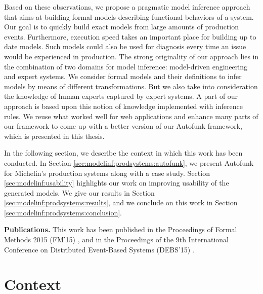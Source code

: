 Based on these observations, we propose a pragmatic model
inference approach that aims at building formal models describing
functional behaviors of a system. Our goal is to quickly build
exact models from large amounts of production events.
Furthermore, execution speed takes an important place for
building up to date models. Such models could also be used for
diagnosis every time an issue would be experienced in production.
The strong originality of our approach lies in the combination of
two domains for model inference: model-driven engineering and
expert systems. We consider formal models and their definitions
to infer models by means of different transformations. But we
also take into consideration the knowledge of human experts
captured by expert systems. A part of our approach is based upon
this notion of knowledge implemented with inference rules. We
reuse what worked well for web applications and enhance many
parts of our framework to come up with a better version of our
Autofunk framework, which is presented in this thesis.

In the following section, we describe the context in which this
work has been conducted. In Section
\ref{sec:modelinf:prodsystems:autofunk}, we present Autofunk for
Michelin's production systems along with a case study. Section
\ref{sec:modelinf:usability} highlights our work on improving
usability of the generated models.  We give our results in
Section \ref{sec:modelinf:prodsystems:results}, and we conclude
on this work in Section \ref{sec:modelinf:prodsystems:conclusion}.

\textbf{Publications.} This work has been published in the
Proceedings of Formal Methods 2015 (FM'15)
\cite{DBLP:conf/fm/DurandS15}, and in the Proceedings of the 9th
International Conference on Distributed Event-Based Systems
(DEBS'15) \cite{DBLP:conf/debs/SalvaD15}.

\section{Context}
\label{prodsys:context}

